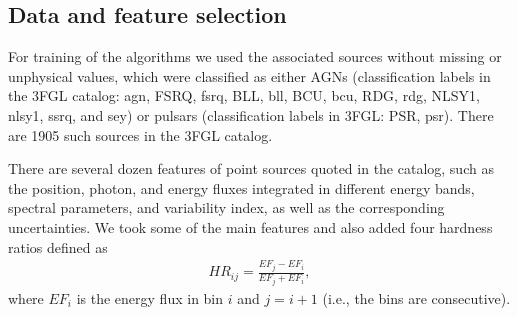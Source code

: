 \documentclass[referee]{aa} %
\newcommand{\bea}{\begin{eqnarray}}
\newcommand{\eea}{\end{eqnarray}}
\newcommand{\lb}{\label}
\begin{document}
\subsection{Data and feature selection}

For training of the algorithms we used the associated sources without missing or unphysical values, 
which were classified as either AGNs (classification labels in the 3FGL catalog: agn, FSRQ, fsrq, BLL, bll, BCU, bcu, RDG, rdg, NLSY1, nlsy1, ssrq, and sey) or pulsars (classification labels in 3FGL: PSR, psr). 
There are 1905 such sources in the 3FGL catalog. 

There are several dozen features of point sources quoted in the catalog, such as the position, photon, and energy fluxes integrated in different energy bands, spectral parameters, and variability index, as well as the corresponding uncertainties. 
We took some of the main features and also added four hardness ratios defined as 
\bea
\lb{eq:hr}
HR_{ij} = \frac{EF_j - EF_i}{EF_j + EF_i},
\eea
where $EF_i$ is the energy flux in bin $i$ and $j = i + 1$ (i.e., the bins are consecutive).
\end{document}
